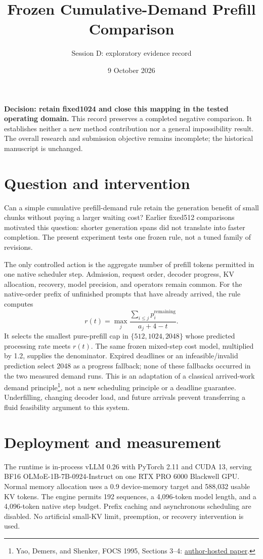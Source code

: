 \documentclass[10pt,a4paper]{article}
\title{Frozen Cumulative-Demand Prefill Comparison}
\author{Session D: exploratory evidence record}
\date{9 October 2026}
\begin{document}
\maketitle
\vspace{-5mm}
\textbf{Decision: retain fixed1024 and close this mapping in the tested operating domain.}
This record preserves a completed negative comparison. It establishes neither a new
method contribution nor a general impossibility result. The overall research and
submission objective remains incomplete; the historical manuscript is unchanged.

\section*{Question and intervention}
Can a simple cumulative prefill-demand rule retain the generation benefit of small
chunks without paying a larger waiting cost? Earlier fixed512 comparisons motivated
this question: shorter generation spans did not translate into faster completion.
The present experiment tests one frozen rule, not a tuned family of revisions.

The only controlled action is the aggregate number of prefill tokens permitted in
one native scheduler step. Admission, request order, decoder progress, KV allocation,
recovery, model precision, and operators remain common. For the native-order prefix
of unfinished prompts that have already arrived, the rule computes
\[
 r(t)=\max_j\frac{\sum_{i\leq j}p_i^{\mathrm{remaining}}}{a_j+4-t}.
\]
It selects the smallest pure-prefill cap in $\{512,1024,2048\}$ whose predicted
processing rate meets $r(t)$. The same frozen mixed-step cost model, multiplied by
1.2, supplies the denominator. Expired deadlines or an infeasible/invalid prediction
select 2048 as a progress fallback; none of these fallbacks occurred in the two
measured demand runs. This is an adaptation of a classical arrived-work demand
principle\footnote{Yao, Demers, and Shenker, FOCS 1995, Sections 3--4:
\href{https://perso.ens-lyon.fr/loris.marchal/scheduling/Yao-FOCS95-Energy.pdf}{author-hosted paper}.},
not a new scheduling principle or a deadline guarantee. Underfilling,
changing decoder load, and future arrivals prevent transferring a fluid feasibility
argument to this system.

\section*{Deployment and measurement}
The runtime is in-process vLLM 0.26 with PyTorch 2.11 and CUDA 13, serving BF16
OLMoE-1B-7B-0924-Instruct on one RTX PRO 6000 Blackwell GPU. Normal memory allocation
uses a 0.9 device-memory target and 588,032 usable KV tokens. The engine permits
192 sequences, a 4,096-token model length, and a 4,096-token native step budget.
Prefix caching and asynchronous scheduling are disabled. No artificial small-KV
limit, preemption, or recovery intervention is used.
\end{document}
